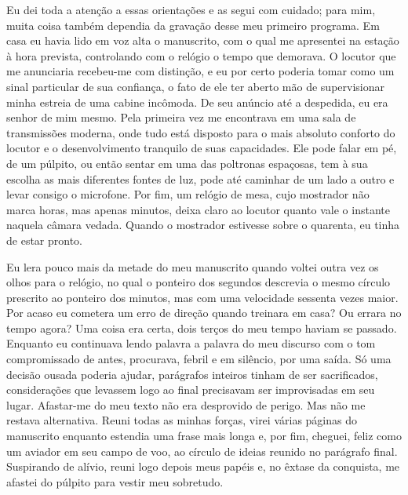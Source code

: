 Eu dei toda a atenção a essas orientações e as segui com cuidado; para
mim, muita coisa também dependia da gravação desse meu primeiro
programa. Em casa eu havia lido em voz alta o manuscrito, com o qual me
apresentei na estação à hora prevista, controlando com o relógio o tempo
que demorava. O locutor que me anunciaria recebeu-me com distinção, e eu
por certo poderia tomar como um sinal particular de sua confiança, o
fato de ele ter aberto mão de supervisionar minha estreia de uma cabine
incômoda. De seu anúncio até a despedida, eu era senhor de mim mesmo.
Pela primeira vez me encontrava em uma sala de transmissões moderna,
onde tudo está disposto para o mais absoluto conforto do locutor e o
desenvolvimento tranquilo de suas capacidades. Ele pode falar em pé, de
um púlpito, ou então sentar em uma das poltronas espaçosas, tem à sua
escolha as mais diferentes fontes de luz, pode até caminhar de um lado a
outro e levar consigo o microfone. Por fim, um relógio de mesa, cujo
mostrador não marca horas, mas apenas minutos, deixa claro ao locutor
quanto vale o instante naquela câmara vedada. Quando o mostrador
estivesse sobre o quarenta, eu tinha de estar pronto.

Eu lera pouco mais da metade do meu manuscrito quando voltei outra vez
os olhos para o relógio, no qual o ponteiro dos segundos descrevia o
mesmo círculo prescrito ao ponteiro dos minutos, mas com uma velocidade
sessenta vezes maior. Por acaso eu cometera um erro de direção quando
treinara em casa? Ou errara no tempo agora? Uma coisa era certa, dois
terços do meu tempo haviam se passado. Enquanto eu continuava lendo
palavra a palavra do meu discurso com o tom compromissado de antes,
procurava, febril e em silêncio, por uma saída. Só uma decisão ousada
poderia ajudar, parágrafos inteiros tinham de ser sacrificados,
considerações que levassem logo ao final precisavam ser improvisadas em
seu lugar. Afastar-me do meu texto não era desprovido de perigo. Mas não
me restava alternativa. Reuni todas as minhas forças, virei várias
páginas do manuscrito enquanto estendia uma frase mais longa e, por fim,
cheguei, feliz como um aviador em seu campo de voo, ao círculo de ideias
reunido no parágrafo final. Suspirando de alívio, reuni logo depois meus
papéis e, no êxtase da conquista, me afastei do púlpito para vestir meu
sobretudo.

